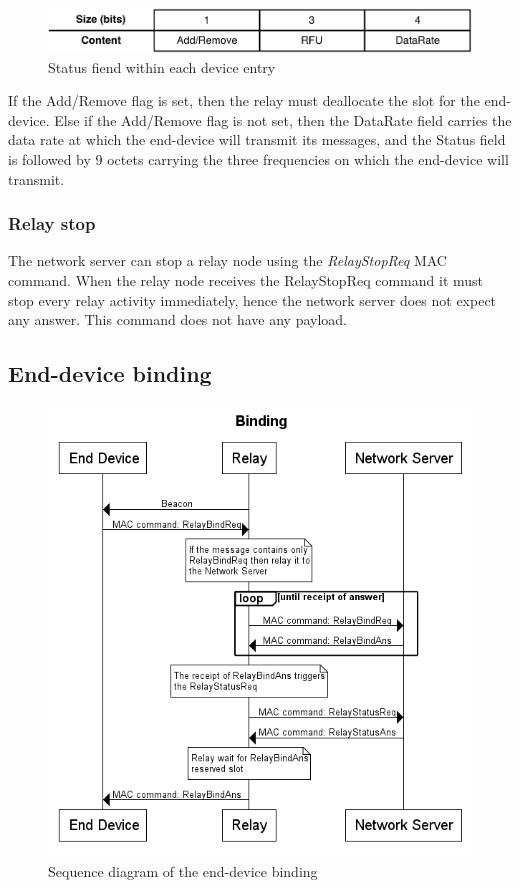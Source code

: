 \begin{figure}[!h]
\centering
\includegraphics[width=\textwidth]{img/commands/DevEntryStatus}
\caption{Status fiend within each device entry}
\label{fig:deventrystatus}
\end{figure}

If the Add/Remove flag is set, then the relay must deallocate the slot for the end-device. Else if the Add/Remove flag is not set, then the DataRate field carries the data rate at which the end-device will transmit its messages, and the Status field is followed by 9 octets carrying the three frequencies on which the end-device will transmit.

\subsubsection{Relay stop}
The network server can stop a relay node using the \emph{RelayStopReq} MAC command. When the relay node receives the RelayStopReq command it must stop every relay activity immediately, hence the network server does not expect any answer. This command does not have any payload.


\subsection{End-device binding}
\begin{figure}[]
\centering
\includegraphics[width=\textwidth]{img/seqdia/binding}
\caption{Sequence diagram of the end-device binding}
\label{fig:binding}
\end{figure}

